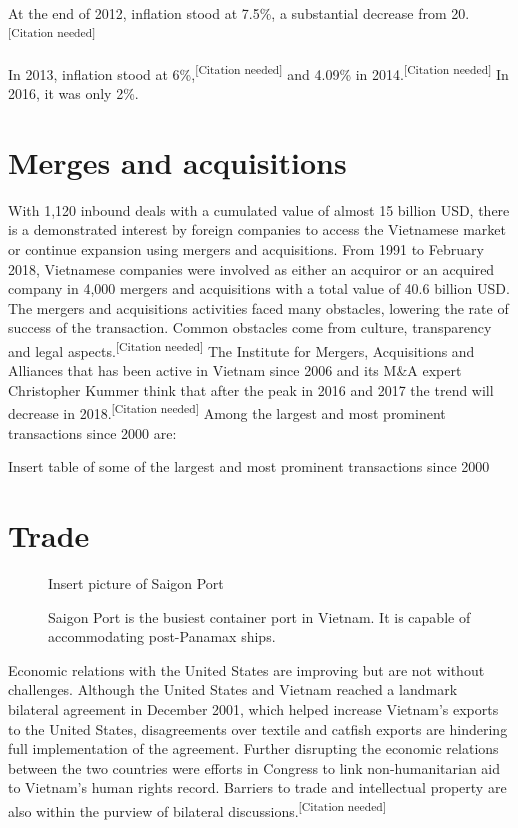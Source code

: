 \documentclass{article}
\begin{document}
At the end of 2012, inflation stood at 7.5\%, a substantial decrease from 20.\textsuperscript{[Citation needed]}

In 2013, inflation stood at 6\%,\textsuperscript{[Citation needed]} and 4.09\% in 2014.\textsuperscript{[Citation needed]} In 2016, it was only 2\%.

\section*{Merges and acquisitions}

With 1,120 inbound deals with a cumulated value of almost 15 billion USD, there is a demonstrated interest by foreign companies to access the Vietnamese market or continue expansion using mergers and acquisitions. From 1991 to February 2018, Vietnamese companies were involved as either an acquiror or an acquired company in 4,000 mergers and acquisitions with a total value of 40.6 billion USD. The mergers and acquisitions activities faced many obstacles, lowering the rate of success of the transaction. Common obstacles come from culture, transparency and legal aspects.\textsuperscript{[Citation needed]} The Institute for Mergers, Acquisitions and Alliances that has been active in Vietnam since 2006 and its M\&A expert Christopher Kummer think that after the peak in 2016 and 2017 the trend will decrease in 2018.\textsuperscript{[Citation needed]} Among the largest and most prominent transactions since 2000 are:

\begin{table}[h]
    \centering
    Insert table of some of the largest and most prominent transactions since 2000
\end{table}

\section*{Trade}

\begin{figure}
    \begin{framed}
    Insert picture of Saigon Port
    \caption*{Saigon Port is the busiest container port in Vietnam. It is capable of accommodating post-Panamax ships.}
    \end{framed}
\end{figure}

Economic relations with the United States are improving but are not without challenges. Although the United States and Vietnam reached a landmark bilateral agreement in December 2001, which helped increase Vietnam's exports to the United States, disagreements over textile and catfish exports are hindering full implementation of the agreement. Further disrupting the economic relations between the two countries were efforts in Congress to link non-humanitarian aid to Vietnam's human rights record. Barriers to trade and intellectual property are also within the purview of bilateral discussions.\textsuperscript{[Citation needed]}
\end{document}
